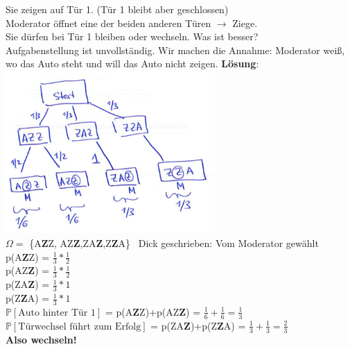 Sie zeigen auf Tür 1. (Tür 1 bleibt aber geschlossen)\\
Moderator öffnet eine der beiden anderen Türen $\rightarrow$ Ziege.\\
Sie dürfen bei Tür 1 bleiben oder wechseln. Was ist besser?\smallskip\\
Aufgabenstellung ist unvollständig. Wir machen die Annahme: Moderator weiß, wo das Auto steht und will das Auto nicht zeigen.\newpage
\textbf{Lösung}: \\\includegraphics[width=0.6\textwidth]{img/ziege.PNG}\\
$\Omega =$ \{A\textbf{Z}Z, AZ\textbf{Z},ZA\textbf{Z},Z\textbf{Z}A\}\ \hspace{ 1cm} Dick geschrieben: Vom Moderator  gewählt \medskip\\
p(A\textbf{Z}Z) = $\frac{1}{3}*\frac{1}{2}$\smallskip\\
p(AZ\textbf{Z}) = $\frac{1}{3}*\frac{1}{2}$\smallskip\\
p(ZA\textbf{Z}) = $\frac{1}{3}*1$\smallskip\\
p(Z\textbf{Z}A) = $\frac{1}{3}*1$\medskip\\
$\mathds{P}[\text{Auto hinter Tür 1}] $ = p(A\textbf{Z}Z)+p(AZ\textbf{Z}) = $\frac{1}{6}+\frac{1}{6}=\frac{1}{3}$\\
$\mathds{P}[\text{Türwechsel führt zum Erfolg}]$ = p(ZA\textbf{Z})+p(Z\textbf{Z}A) = $\frac{1}{3}+\frac{1}{3}= \frac{2}{3}$\\
\textbf{Also wechseln!}

